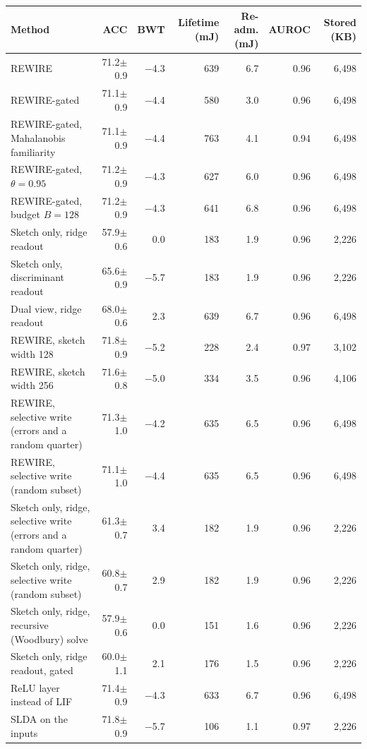 \begin{tabular*}{\textwidth}{@{\extracolsep{\fill}}lrrrrrr@{}}
\toprule
Method & ACC & BWT & Lifetime (mJ) & Re-adm. (mJ) & AUROC & Stored (KB) \\
\midrule
REWIRE & 71.2$\pm$0.9 & \ensuremath{-}4.3 & 639 & 6.7 & 0.96 & 6,498 \\
REWIRE-gated & 71.1$\pm$0.9 & \ensuremath{-}4.4 & 580 & 3.0 & 0.96 & 6,498 \\
REWIRE-gated, Mahalanobis familiarity & 71.1$\pm$0.9 & \ensuremath{-}4.4 & 763 & 4.1 & 0.94 & 6,498 \\
REWIRE-gated, $\theta=0.95$ & 71.2$\pm$0.9 & \ensuremath{-}4.3 & 627 & 6.0 & 0.96 & 6,498 \\
REWIRE-gated, budget $B=128$ & 71.2$\pm$0.9 & \ensuremath{-}4.3 & 641 & 6.8 & 0.96 & 6,498 \\
Sketch only, ridge readout & 57.9$\pm$0.6 & 0.0 & 183 & 1.9 & 0.96 & 2,226 \\
Sketch only, discriminant readout & 65.6$\pm$0.9 & \ensuremath{-}5.7 & 183 & 1.9 & 0.96 & 2,226 \\
Dual view, ridge readout & 68.0$\pm$0.6 & 2.3 & 639 & 6.7 & 0.96 & 6,498 \\
REWIRE, sketch width 128 & 71.8$\pm$0.9 & \ensuremath{-}5.2 & 228 & 2.4 & 0.97 & 3,102 \\
REWIRE, sketch width 256 & 71.6$\pm$0.8 & \ensuremath{-}5.0 & 334 & 3.5 & 0.96 & 4,106 \\
REWIRE, selective write (errors and a random quarter) & 71.3$\pm$1.0 & \ensuremath{-}4.2 & 635 & 6.5 & 0.96 & 6,498 \\
REWIRE, selective write (random subset) & 71.1$\pm$1.0 & \ensuremath{-}4.4 & 635 & 6.5 & 0.96 & 6,498 \\
Sketch only, ridge, selective write (errors and a random quarter) & 61.3$\pm$0.7 & 3.4 & 182 & 1.9 & 0.96 & 2,226 \\
Sketch only, ridge, selective write (random subset) & 60.8$\pm$0.7 & 2.9 & 182 & 1.9 & 0.96 & 2,226 \\
Sketch only, ridge, recursive (Woodbury) solve & 57.9$\pm$0.6 & 0.0 & 151 & 1.6 & 0.96 & 2,226 \\
Sketch only, ridge readout, gated & 60.0$\pm$1.1 & 2.1 & 176 & 1.5 & 0.96 & 2,226 \\
ReLU layer instead of LIF & 71.4$\pm$0.9 & \ensuremath{-}4.3 & 633 & 6.7 & 0.96 & 6,498 \\
SLDA on the inputs & 71.8$\pm$0.9 & \ensuremath{-}5.7 & 106 & 1.1 & 0.97 & 2,226 \\

\end{tabular*}
